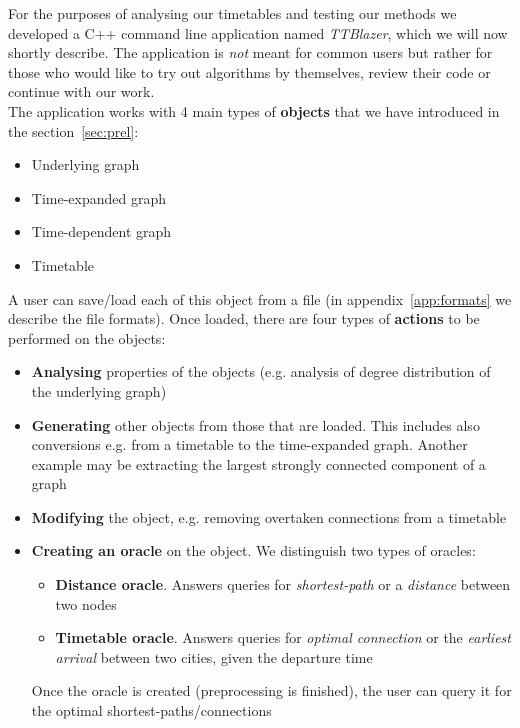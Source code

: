 \noindent For the purposes of analysing our timetables and testing our methods we developed a C++ command line application named \textit{TTBlazer}, which we will now shortly describe. The application is \textit{not} meant for common users but rather for those who would like to try out algorithms by themselves, review their code or continue with our work. \\

\noindent The application works with 4 main types of \textbf{objects} that we have introduced in the section~\ref{sec:prel}:
\begin{itemize}
	\item Underlying graph
	\item Time-expanded graph
	\item Time-dependent graph
	\item Timetable
\end{itemize}
\hspace*{\fill}

\noindent A user can save/load each of this object from a file (in appendix~\ref{app:formats} we describe the file formats). Once loaded, there are four types of \textbf{actions} to be performed on the objects:
\begin{itemize}
	\item \textbf{Analysing} properties of the objects (e.g. analysis of degree distribution of the underlying graph)
	\item \textbf{Generating} other objects from those that are loaded. This includes also conversions e.g. from a timetable to the time-expanded graph. Another example may be extracting the largest strongly connected component of a graph
	\item \textbf{Modifying} the object, e.g. removing overtaken connections from a timetable
	\item \textbf{Creating an oracle} on the object. We distinguish two types of oracles:
	\begin{itemize}
		\item \textbf{Distance oracle}. Answers queries for \textit{shortest-path} or a \textit{distance} between two nodes
		\item \textbf{Timetable oracle}. Answers queries for \textit{optimal connection} or the \textit{earliest arrival} between two cities, given the departure time
	\end{itemize}
	Once the oracle is created (preprocessing is finished), the user can query it for the optimal shortest-paths/connections
\end{itemize}
\hspace{\fill}

